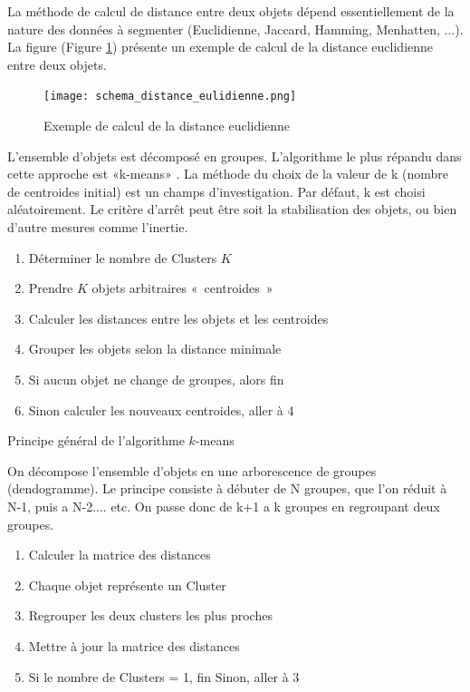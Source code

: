 \documentclass[a4paper,12pt]{article}
\begin{document}

        La méthode de calcul de distance entre deux objets dépend essentiellement de
        la nature des données à segmenter (Euclidienne, Jaccard, Hamming,
        Menhatten, ...). La figure (Figure \ref{fig:distance_eulidienne}) présente un exemple de calcul de la distance
        euclidienne entre deux objets.
            
        \begin{figure}[h]
            \centering
            \texttt{[image: schema\_distance\_eulidienne.png]}
            \caption{Exemple de calcul de la distance euclidienne}
            \label{fig:distance_eulidienne}
        \end{figure}


        L'ensemble d'objets est décomposé en groupes. L’algorithme le plus répandu
        dans cette approche est «k-means» . La méthode du choix de la
        valeur de k (nombre de centroides initial) est un champs d’investigation. Par
        défaut, k est choisi aléatoirement. Le critère d’arrêt peut être soit la stabilisation
        des objets, ou bien d’autre mesures comme l’inertie. \\


        \begin{enumerate}[leftmargin=*]
            \item Déterminer le nombre de Clusters \( K\)
            \item Prendre \( K \) objets arbitraires «~centroides~»
            \item Calculer les distances entre les objets et les centroides
            \item Grouper les objets selon la distance minimale
            \item Si aucun objet ne change de groupes, alors fin
            \item Sinon calculer les nouveaux centroides, aller à 4
        \end{enumerate}
        
        Principe général de l’algorithme \( k \)-means

        On décompose l'ensemble d'objets en une arborescence de groupes
        (dendogramme). Le principe consiste à débuter de N groupes, que l'on réduit à
        N-1, puis a N-2.... etc. On passe donc de k+1 a k groupes en regroupant deux
        groupes. 
        \\
        \begin{enumerate}[leftmargin=*]
            \item Calculer la matrice des distances
            \item Chaque objet représente un Cluster
            \item Regrouper les deux clusters les plus proches
            \item Mettre à jour la matrice des distances
            \item Si le nombre de Clusters = 1, fin Sinon, aller à 3
          \end{enumerate}
        
\end{document}
